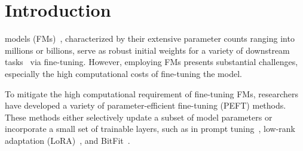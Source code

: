 \documentclass[lettersize,journal]{IEEEtran}
\newcommand{\ping}[1]{\textcolor{magenta}{#1}}
\begin{document}
\section{Introduction}
 models (FMs)~\cite{dosovitskiy2020image, devlin2019bert, lyu2023attention, study2022, zhou2023comprehensive}, characterized by their extensive parameter counts ranging into millions or billions, serve as robust initial weights for a variety of downstream tasks~\cite{wu2023visual,wang2018glue} via fine-tuning. However, employing FMs presents substantial challenges, especially the high computational costs of fine-tuning the model.

To mitigate the high computational requirement of fine-tuning FMs, researchers have developed a variety of parameter-efficient fine-tuning (PEFT) methods. These methods either selectively update a subset of model parameters or incorporate a small set of trainable layers, such as in prompt tuning~\cite{lester2021power}, low-rank adaptation (LoRA)~\cite{hu2021lora}, and BitFit~\cite{zaken2022bitfit}.
% 
\end{document}
